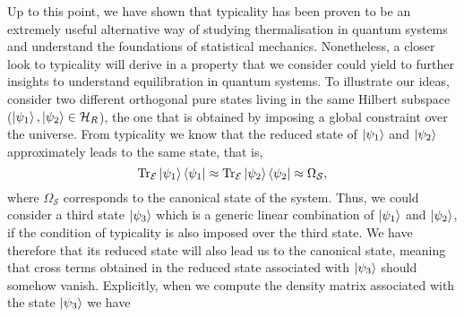 \indent Up to this point, we have shown that typicality has been proven to be an extremely useful alternative way of studying thermalisation in quantum systems and understand the foundations of statistical mechanics. Nonetheless, a closer look to typicality will derive in a property that we consider could yield to further insights to understand equilibration in quantum systems. To illustrate our ideas, consider two different orthogonal pure states living in the same Hilbert subspace ($\mathinner{|{\psi_1}\rangle},\mathinner{|{\psi_2}\rangle} \in \mathcal{H}_{R}$), the one that is obtained by imposing a global constraint over the universe. From typicality we know that the reduced state of $\mathinner{|{\psi_1}\rangle}$ and $\mathinner{|{\psi_2}\rangle}$ approximately leads to the same state, that is, 
\begin{equation}
\operatorname{Tr}_{\mathcal{E}}\mathinner{|{\psi_1}\rangle}\mathinner{\langle{\psi_1}|}\approx\operatorname{Tr}_{\mathcal{E}}\mathinner{|{\psi_2}\rangle}\mathinner{\langle{\psi_2}|}\approx\Omega_{\mathcal{S}},
\end{equation}
where $\Omega_{\mathcal{S}}$ corresponds to the canonical state of the system.
Thus, we could consider a third state $\mathinner{|{\psi_3}\rangle}$ which is a generic linear combination of $\mathinner{|{\psi_1}\rangle}$ and $\mathinner{|{\psi_2}\rangle}$, if the condition of typicality is also imposed over the third state. We have therefore that its reduced state will also lead us to the canonical state, meaning that cross terms obtained in the reduced state associated with $\mathinner{|{\psi_3}\rangle}$ should somehow vanish. Explicitly, when we compute the density matrix associated with the state $\mathinner{|{\psi_3}\rangle}$ we have 
